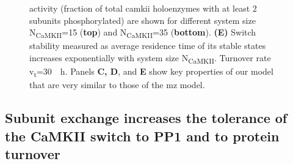 \documentclass[9pt,lineno,doublespacing]{elife}
\newcommand\SUB[2]{#1\textsubscript{#2}}
\begin{document}
\begin{figure}[t]
{        activity (fraction of total \gls{camkii} holoenzymes with at least 2
        subunits phosphorylated) are shown for different system size
        \SUB{N}{CaMKII}=15 (\textbf{top}) and \SUB{N}{CaMKII}=35
        (\textbf{bottom}).  \textbf{(E)} Switch stability measured as average
        residence time of its stable states increases exponentially with system
        size \SUB{N}{CaMKII}.  Turnover rate \SUB{v}{t}=\SI{30}{\per \hour}.
        Panels \textbf{C, D}, and \textbf{E} show key properties of our model
        that are very similar to those of the \gls{mz} model.
    }\label{fig:validation} 
\end{figure}


\subsection{Subunit exchange increases the tolerance of the CaMKII switch to PP1 
and to protein turnover}\label{subsec:result_tolerance}
\end{document}
